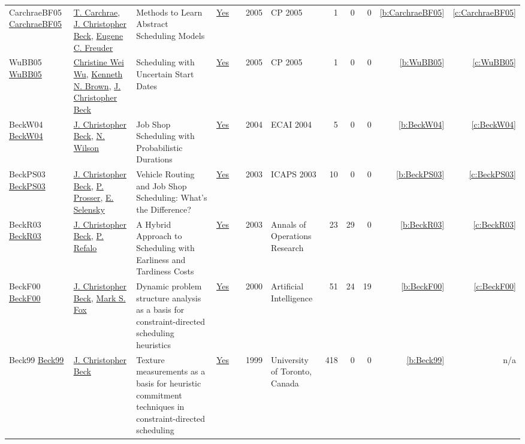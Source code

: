{\begin{longtable}{>{\raggedright\arraybackslash}p{3cm}>{\raggedright\arraybackslash}p{6cm}>{\raggedright\arraybackslash}p{6.5cm}rrrp{2.5cm}rrrrr}
CarchraeBF05 \href{https://doi.org/10.1007/11564751\_80}{CarchraeBF05} & \hyperref[auth:a275]{T. Carchrae}, \hyperref[auth:a89]{J. Christopher Beck}, \hyperref[auth:a276]{Eugene C. Freuder} & Methods to Learn Abstract Scheduling Models & \href{../works/CarchraeBF05.pdf}{Yes} & \cite{CarchraeBF05} & 2005 & CP 2005 & 1 & 0 & 0 & \ref{b:CarchraeBF05} & \ref{c:CarchraeBF05}\\
WuBB05 \href{https://doi.org/10.1007/11564751\_110}{WuBB05} & \hyperref[auth:a277]{Christine Wei Wu}, \hyperref[auth:a223]{Kenneth N. Brown}, \hyperref[auth:a89]{J. Christopher Beck} & Scheduling with Uncertain Start Dates & \href{../works/WuBB05.pdf}{Yes} & \cite{WuBB05} & 2005 & CP 2005 & 1 & 0 & 0 & \ref{b:WuBB05} & \ref{c:WuBB05}\\
BeckW04 \href{}{BeckW04} & \hyperref[auth:a89]{J. Christopher Beck}, \hyperref[auth:a838]{N. Wilson} & Job Shop Scheduling with Probabilistic Durations & \href{../works/BeckW04.pdf}{Yes} & \cite{BeckW04} & 2004 & ECAI 2004 & 5 & 0 & 0 & \ref{b:BeckW04} & \ref{c:BeckW04}\\
BeckPS03 \href{http://www.aaai.org/Library/ICAPS/2003/icaps03-027.php}{BeckPS03} & \hyperref[auth:a89]{J. Christopher Beck}, \hyperref[auth:a839]{P. Prosser}, \hyperref[auth:a840]{E. Selensky} & Vehicle Routing and Job Shop Scheduling: What's the Difference? & \href{../works/BeckPS03.pdf}{Yes} & \cite{BeckPS03} & 2003 & ICAPS 2003 & 10 & 0 & 0 & \ref{b:BeckPS03} & \ref{c:BeckPS03}\\
BeckR03 \href{https://doi.org/10.1023/A:1021849405707}{BeckR03} & \hyperref[auth:a89]{J. Christopher Beck}, \hyperref[auth:a257]{P. Refalo} & A Hybrid Approach to Scheduling with Earliness and Tardiness Costs & \href{../works/BeckR03.pdf}{Yes} & \cite{BeckR03} & 2003 & Annals of Operations Research & 23 & 29 & 0 & \ref{b:BeckR03} & \ref{c:BeckR03}\\
BeckF00 \href{https://doi.org/10.1016/S0004-3702(99)00099-5}{BeckF00} & \hyperref[auth:a89]{J. Christopher Beck}, \hyperref[auth:a305]{Mark S. Fox} & Dynamic problem structure analysis as a basis for constraint-directed scheduling heuristics & \href{../works/BeckF00.pdf}{Yes} & \cite{BeckF00} & 2000 & Artificial Intelligence & 51 & 24 & 19 & \ref{b:BeckF00} & \ref{c:BeckF00}\\
Beck99 \href{https://librarysearch.library.utoronto.ca/permalink/01UTORONTO\_INST/14bjeso/alma991106162342106196}{Beck99} & \hyperref[auth:a89]{J. Christopher Beck} & Texture measurements as a basis for heuristic commitment techniques in constraint-directed scheduling & \href{../works/Beck99.pdf}{Yes} & \cite{Beck99} & 1999 & University of Toronto, Canada & 418 & 0 & 0 & \ref{b:Beck99} & n/a\\

\end{longtable}}
